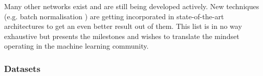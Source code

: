 
Many other networks exist and are still being developed actively. New techniques (e.g. batch normalisation \cite{Ioffe2015}) are getting incorporated in state-of-the-art architectures to get an even better result out of them. This list is in no way exhaustive but presents the milestones and wishes to translate the mindset operating in the machine learning community.



\subsubsection{Datasets}

